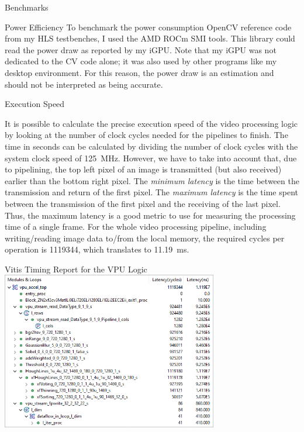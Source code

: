 \documentclass{matthijs}
\begin{document}
\begin{hoofdstuk}{Benchmarks}
\begin{paragraaf}{Power Efficiency}
			To benchmark the power consumption OpenCV reference code from my HLS testbenches, I used the AMD ROCm SMI tools.
			This library could read the power draw as reported by my iGPU.
			Note that my iGPU was not dedicated to the CV code alone; it was also used by other programs like my desktop environment.
			For this reason, the power draw is an estimation and should not be interpreted as being accurate.

		\end{paragraaf}

		\begin{paragraaf}{Execution Speed}

			It is possible to calculate the precise execution speed of the video processing logic by looking at the number of clock cycles needed for the pipelines to finish.
			The time in seconds can be calculated by dividing the number of clock cycles with the system clock speed of \qty{125}{\mega\hertz}.
			However, we have to take into account that, due to pipelining, the top left pixel of an image is transmitted (but also received) earlier than the bottom right pixel.
			The \textit{minimum latency} is the time between the transmission and return of the first pixel.
			The \textit{maximum latency} is the time spent between the transmission of the first pixel and the receiving of the last pixel.
			Thus, the maximum latency is a good metric to use for measuring the processing time of a single frame.
			For the whole video processing pipeline, including writing/reading image data to/from the local memory, the required cycles per operation is 1119344, which translates to \qty{11.19}{\milli\second}.

			\begin{figuur}{Vitis Timing Report for the VPU Logic}
				\includegraphics[width=0.7075\textwidth]{vitis-timing-bad-quality.png}
			\end{figuur}


\end{paragraaf}
\end{hoofdstuk}
\end{document}
